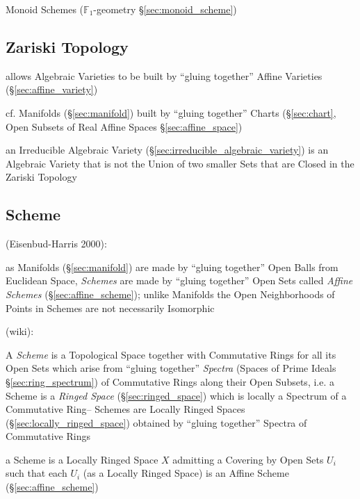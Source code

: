 \fist Monoid Schemes ($\mathbb{F}_1$-geometry \S\ref{sec:monoid_scheme})



\subsection{Zariski Topology}\label{sec:zariski_topology}

allows Algebraic Varieties to be built by ``gluing together'' Affine Varieties
 (\S\ref{sec:affine_variety})

cf. Manifolds (\S\ref{sec:manifold}) built by ``gluing together'' Charts
(\S\ref{sec:chart}, Open Subsets of Real Affine Spaces
\S\ref{sec:affine_space})

an Irreducible Algebraic Variety (\S\ref{sec:irreducible_algebraic_variety}) is
an Algebraic Variety that is not the Union of two smaller Sets that are Closed
in the Zariski Topology



\subsection{Scheme}\label{sec:scheme}

(Eisenbud-Harris 2000):

as Manifolds (\S\ref{sec:manifold}) are made by ``gluing together'' Open Balls
from Euclidean Space, \emph{Schemes} are made by ``gluing together'' Open Sets
called \emph{Affine Schemes} (\S\ref{sec:affine_scheme}); unlike Manifolds the
Open Neighborhoods of Points in Schemes are not necessarily Isomorphic

(wiki):

A \emph{Scheme} is a Topological Space together with Commutative Rings for all
its Open Sets which arise from ``gluing together'' \emph{Spectra} (Spaces of
Prime Ideals \S\ref{sec:ring_spectrum}) of Commutative Rings along their Open
Subsets, i.e. a Scheme is a \emph{Ringed Space} (\S\ref{sec:ringed_space})
which is locally a Spectrum of a Commutative Ring-- Schemes are Locally Ringed
Spaces (\S\ref{sec:locally_ringed_space}) obtained by ``gluing together''
Spectra of Commutative Rings

a Scheme is a Locally Ringed Space $X$ admitting a Covering by Open Sets $U_i$
such that each $U_i$ (as a Locally Ringed Space) is an Affine Scheme
(\S\ref{sec:affine_scheme})

